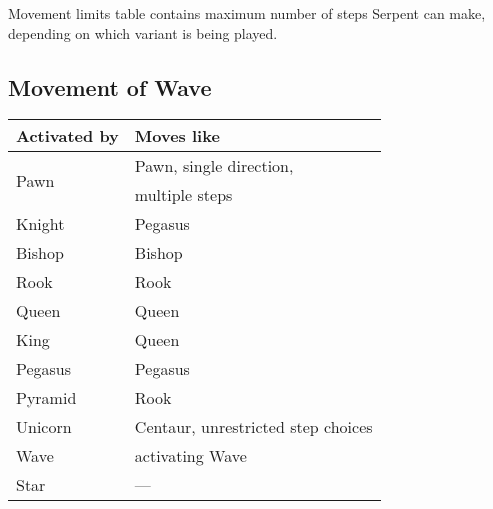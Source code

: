 Movement limits table contains maximum number of steps Serpent can make,
depending on which variant is being played.

\clearpage %

\subsection*{Movement of Wave}
\label{sec:Appendix/Movement of Wave}

\begin{table}[!h]
\centering
\begin{tabular}{ ll }
\toprule %
\textbf{Activated by}       & \textbf{Moves like}                       \\
\midrule %
\multirow{2}{*}{Pawn}       & Pawn, single direction,                   \\
                            & multiple steps                            \\
\cmidrule{1-2} %
Knight                      & Pegasus                                   \\
Bishop                      & Bishop                                    \\
Rook                        & Rook                                      \\
Queen                       & Queen                                     \\
King                        & Queen                                     \\
\cmidrule{1-2} %
Pegasus                     & Pegasus                                   \\
Pyramid                     & Rook                                      \\
Unicorn                     & Centaur, unrestricted step choices        \\
Wave                        & activating Wave                           \\
Star                        & ---                                       \\

\end{tabular}
\end{table}
